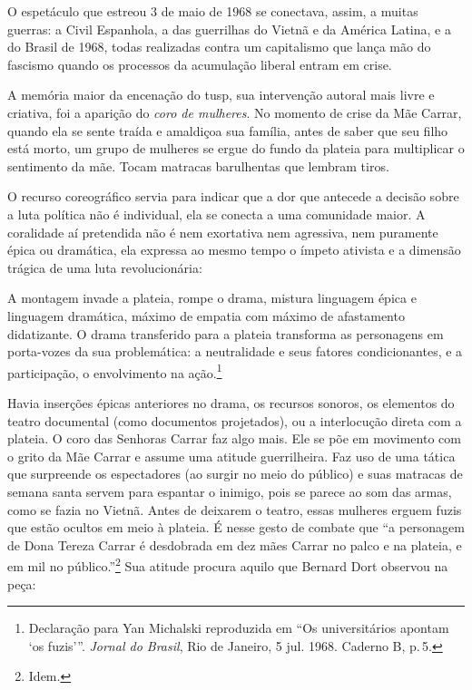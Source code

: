 O espetáculo que estreou 3 de maio de 1968 se conectava, assim, a muitas
guerras: a Civil Espanhola, a das guerrilhas do Vietnã e da América
Latina, e a do Brasil de 1968, todas realizadas contra um capitalismo
que lança mão do fascismo quando os processos da acumulação liberal
entram em crise.

\page

\subject{Coro das mulheres em armas}

A memória maior da encenação do {\sc tusp}, sua intervenção autoral mais livre
e criativa, foi a aparição do {\it coro de mulheres}. No momento de
crise da Mãe Carrar, quando ela se sente traída e amaldiçoa sua família,
antes de saber que seu filho está morto, um grupo de mulheres se ergue
do fundo da plateia para multiplicar o sentimento da mãe. Tocam matracas
barulhentas que lembram tiros.

O recurso coreográfico servia para indicar que a dor que antecede a
decisão sobre a luta política não é individual, ela se conecta a uma
comunidade maior. A coralidade aí pretendida não é nem exortativa nem
agressiva, nem puramente épica ou dramática, ela expressa ao mesmo tempo
o ímpeto ativista e a dimensão trágica de uma luta revolucionária:

\startblockquote
A montagem invade a plateia, rompe o drama, mistura linguagem épica e
linguagem dramática, máximo de empatia com máximo de afastamento
didatizante. O drama transferido para a plateia transforma as
personagens em porta-vozes da sua problemática: a neutralidade e seus
fatores condicionantes, e a participação, o envolvimento na
ação.\footnote{Declaração para Yan Michalski reproduzida em “Os
  universitários apontam ‘os fuzis'”. {\it Jornal do Brasil}, Rio de
  Janeiro, 5 jul. 1968. Caderno B, p.\,5.}
\stopblockquote

Havia inserções épicas anteriores no drama, os recursos sonoros, os
elementos do teatro documental (como documentos projetados), ou a
interlocução direta com a plateia. O coro das Senhoras Carrar faz algo
mais. Ele se põe em movimento com o grito da Mãe Carrar e assume uma
atitude guerrilheira. Faz uso de uma tática que surpreende os
espectadores (ao surgir no meio do público) e suas matracas de semana
santa servem para espantar o inimigo, pois se parece ao som das armas,
como se fazia no Vietnã. Antes de deixarem o teatro, essas mulheres
erguem fuzis que estão ocultos em meio à plateia. É nesse gesto de
combate que “a personagem de Dona Tereza Carrar é desdobrada em dez mães
Carrar no palco e na plateia, e em mil no público.”\footnote{Idem.} Sua
atitude procura aquilo que Bernard Dort observou na peça:

